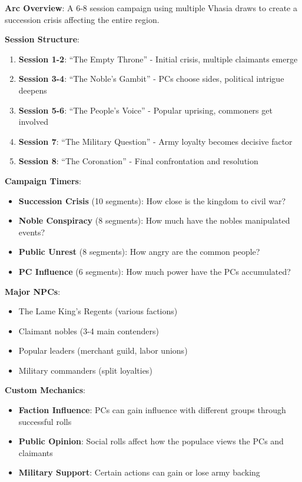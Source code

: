 \documentclass[11pt]{article}
\begin{document}
\begin{mdframed}[backgroundcolor=modulebg]
\textbf{Arc Overview}: A 6-8 session campaign using multiple Vhasia draws to create a succession crisis affecting the entire region.

\textbf{Session Structure}:
\begin{enumerate}[leftmargin=*]
\item \textbf{Session 1-2}: ``The Empty Throne'' - Initial crisis, multiple claimants emerge
\item \textbf{Session 3-4}: ``The Noble's Gambit'' - PCs choose sides, political intrigue deepens  
\item \textbf{Session 5-6}: ``The People's Voice'' - Popular uprising, commoners get involved
\item \textbf{Session 7}: ``The Military Question'' - Army loyalty becomes decisive factor
\item \textbf{Session 8}: ``The Coronation'' - Final confrontation and resolution
\end{enumerate}

\textbf{Campaign Timers}:
\begin{itemize}[leftmargin=*]
\item \textbf{Succession Crisis} (10 segments): How close is the kingdom to civil war?
\item \textbf{Noble Conspiracy} (8 segments): How much have the nobles manipulated events?
\item \textbf{Public Unrest} (8 segments): How angry are the common people?
\item \textbf{PC Influence} (6 segments): How much power have the PCs accumulated?
\end{itemize}

\textbf{Major NPCs}:
\begin{itemize}[leftmargin=*]
\item The Lame King's Regents (various factions)
\item Claimant nobles (3-4 main contenders)
\item Popular leaders (merchant guild, labor unions)
\item Military commanders (split loyalties)
\end{itemize}

\textbf{Custom Mechanics}:
\begin{itemize}[leftmargin=*]
\item \textbf{Faction Influence}: PCs can gain influence with different groups through successful rolls
\item \textbf{Public Opinion}: Social rolls affect how the populace views the PCs and claimants
\item \textbf{Military Support}: Certain actions can gain or lose army backing
\end{itemize}


\end{mdframed}
\end{document}
